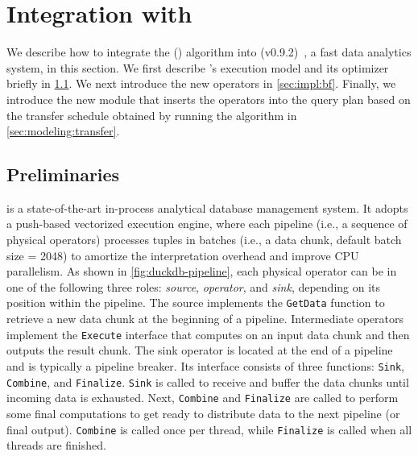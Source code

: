 \section{Integration with \duckdb}
\label{sec:impl}

We describe how to integrate the \emph{\RPT} (\rpt) algorithm into \duckdb (v0.9.2)~\cite{2019duckdb}, a fast data analytics system, in this section. We first describe \duckdb's execution model and its optimizer briefly in \cref{sec:impl:duckdb}. We next introduce the new \BF operators in \cref{sec:impl:bf}. Finally, we introduce the new \RPT module that inserts the \BF operators into the query plan based on the transfer schedule obtained by running the \TreeStruct algorithm in \cref{sec:modeling:transfer}.




\subsection{\duckdb Preliminaries}
\label{sec:impl:duckdb}

\duckdb is a state-of-the-art in-process analytical database management system. It adopts a push-based vectorized execution engine, where each pipeline (i.e., a sequence of physical operators) processes tuples in batches (i.e., a data chunk, default batch size = 2048) to amortize the interpretation overhead and improve CPU parallelism. As shown in \cref{fig:duckdb-pipeline}, each physical operator can be in one of the following three roles: \emph{source}, \emph{operator}, and \emph{sink}, depending on its position within the pipeline. The source implements the \texttt{GetData} function to retrieve a new data chunk at the beginning of a pipeline. Intermediate operators implement the \texttt{Execute} interface that computes on an input data chunk and then outputs the result chunk. The sink operator is located at the end of a pipeline and is typically a pipeline breaker. Its interface consists of three functions: \texttt{Sink}, \texttt{Combine}, and \texttt{Finalize}. \texttt{Sink} is called to receive and buffer the data chunks until incoming data is exhausted. Next, \texttt{Combine} and \texttt{Finalize} are called to perform some final computations to get ready to distribute data to the next pipeline (or final output). \texttt{Combine} is called once per thread, while \texttt{Finalize} is called when all threads are finished.


